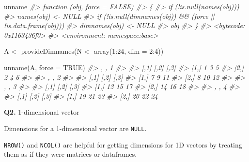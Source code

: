 \documentclass[
]{book}
\newenvironment{Shaded}{\begin{snugshade}}{\end{snugshade}}
\newcommand{\AttributeTok}[1]{\textcolor[rgb]{0.77,0.63,0.00}{#1}}
\newcommand{\CommentTok}[1]{\textcolor[rgb]{0.56,0.35,0.01}{\textit{#1}}}
\newcommand{\ConstantTok}[1]{\textcolor[rgb]{0.00,0.00,0.00}{#1}}
\newcommand{\DecValTok}[1]{\textcolor[rgb]{0.00,0.00,0.81}{#1}}
\newcommand{\FunctionTok}[1]{\textcolor[rgb]{0.00,0.00,0.00}{#1}}
\newcommand{\NormalTok}[1]{#1}
\newcommand{\OtherTok}[1]{\textcolor[rgb]{0.56,0.35,0.01}{#1}}
\newcommand{\SpecialCharTok}[1]{\textcolor[rgb]{0.00,0.00,0.00}{#1}}
\begin{document}
\begin{Shaded}
\begin{Highlighting}[]
\NormalTok{unname}
\CommentTok{\#\textgreater{} function (obj, force = FALSE) }
\CommentTok{\#\textgreater{} \{}
\CommentTok{\#\textgreater{}     if (!is.null(names(obj))) }
\CommentTok{\#\textgreater{}         names(obj) \textless{}{-} NULL}
\CommentTok{\#\textgreater{}     if (!is.null(dimnames(obj)) \&\& (force || !is.data.frame(obj))) }
\CommentTok{\#\textgreater{}         dimnames(obj) \textless{}{-} NULL}
\CommentTok{\#\textgreater{}     obj}
\CommentTok{\#\textgreater{} \}}
\CommentTok{\#\textgreater{} \textless{}bytecode: 0x1163436f0\textgreater{}}
\CommentTok{\#\textgreater{} \textless{}environment: namespace:base\textgreater{}}

\NormalTok{A }\OtherTok{\textless{}{-}} \FunctionTok{provideDimnames}\NormalTok{(N }\OtherTok{\textless{}{-}} \FunctionTok{array}\NormalTok{(}\DecValTok{1}\SpecialCharTok{:}\DecValTok{24}\NormalTok{, }\AttributeTok{dim =} \DecValTok{2}\SpecialCharTok{:}\DecValTok{4}\NormalTok{))}

\FunctionTok{unname}\NormalTok{(A, }\AttributeTok{force =} \ConstantTok{TRUE}\NormalTok{)}
\CommentTok{\#\textgreater{} , , 1}
\CommentTok{\#\textgreater{} }
\CommentTok{\#\textgreater{}      [,1] [,2] [,3]}
\CommentTok{\#\textgreater{} [1,]    1    3    5}
\CommentTok{\#\textgreater{} [2,]    2    4    6}
\CommentTok{\#\textgreater{} }
\CommentTok{\#\textgreater{} , , 2}
\CommentTok{\#\textgreater{} }
\CommentTok{\#\textgreater{}      [,1] [,2] [,3]}
\CommentTok{\#\textgreater{} [1,]    7    9   11}
\CommentTok{\#\textgreater{} [2,]    8   10   12}
\CommentTok{\#\textgreater{} }
\CommentTok{\#\textgreater{} , , 3}
\CommentTok{\#\textgreater{} }
\CommentTok{\#\textgreater{}      [,1] [,2] [,3]}
\CommentTok{\#\textgreater{} [1,]   13   15   17}
\CommentTok{\#\textgreater{} [2,]   14   16   18}
\CommentTok{\#\textgreater{} }
\CommentTok{\#\textgreater{} , , 4}
\CommentTok{\#\textgreater{} }
\CommentTok{\#\textgreater{}      [,1] [,2] [,3]}
\CommentTok{\#\textgreater{} [1,]   19   21   23}
\CommentTok{\#\textgreater{} [2,]   20   22   24}
\end{Highlighting}
\end{Shaded}

\textbf{Q2.} 1-dimensional vector

Dimensions for a 1-dimensional vector are \texttt{NULL}.

\texttt{NROW()} and \texttt{NCOL()} are helpful for getting dimensions for 1D vectors by treating them as if they were matrices or dataframes.
\end{document}
